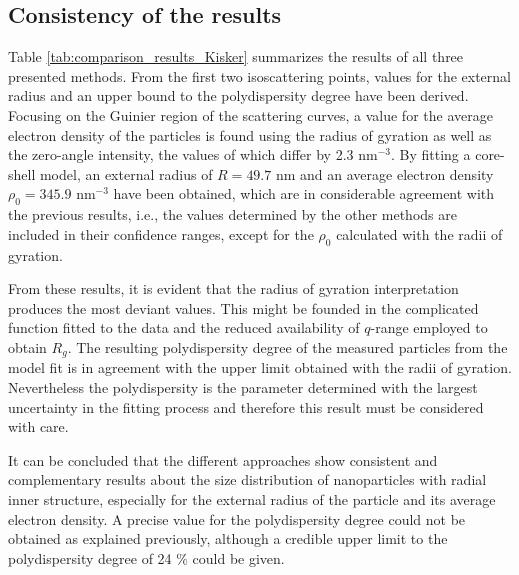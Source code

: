 \subsection{Consistency of the results}
Table \ref{tab:comparison_results_Kisker} summarizes the results of all three presented methods. From the first two isoscattering points, values for the external radius and an upper bound to the polydispersity degree have been derived. Focusing on the Guinier region of the scattering curves, a value for the average electron density of the particles is found using the radius of gyration as well as the zero-angle intensity, the values of which differ by 2.3 nm\(^{-3}\). By fitting a core-shell model, an external radius of \(R=49.7\) nm and an average electron density \(\rho_0=345.9\) nm\(^{-3}\) have been obtained, which are in considerable agreement with the previous results, i.e., the values determined by the other methods are included in their confidence ranges, except for the \(\rho_0\) calculated with the radii of gyration.

From these results, it is evident that the radius of gyration interpretation produces the most deviant values. This might be founded in the complicated function fitted to the data and the reduced availability of $q$-range employed to obtain \( R_g \). The resulting polydispersity degree of the measured particles from the model fit is in agreement with the upper limit obtained with the radii of gyration. Nevertheless the polydispersity is the parameter determined with the largest uncertainty in the fitting process and therefore this result must be considered with care.

It can be concluded that the different approaches show consistent and complementary results about the size distribution of nanoparticles with radial inner structure, especially for the external radius of the particle and its average electron density. A precise value for the polydispersity degree could not be obtained as explained previously, although a credible upper limit to the polydispersity degree of 24 $\%$ could be given.


